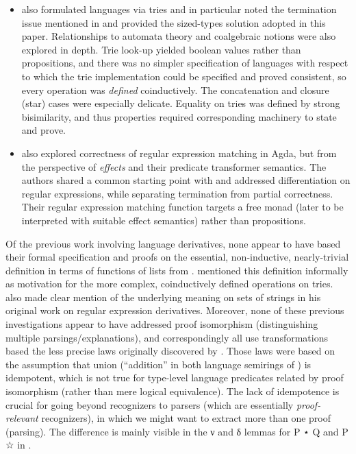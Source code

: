 \documentclass[acmsmall,screen,timestamp,anonymous,review]{acmart}
\begin{document}
\begin{itemize}
\item \citet{Abel2016} also formulated languages via tries and in particular noted the termination issue mentioned in  and provided the sized-types solution adopted in this paper.
Relationships to automata theory and coalgebraic notions were also explored in depth.
Trie look-up yielded boolean values rather than propositions, and there was no simpler specification of languages with respect to which the trie implementation could be specified and proved consistent, so every operation was \emph{defined} coinductively.
The concatenation and closure (star) cases were especially delicate.
Equality on tries was defined by strong bisimilarity, and thus properties required corresponding machinery to state and prove.


\item \citet{BaanenSwierstra2020} also explored correctness of regular expression matching in Agda, but from the perspective of \emph{effects} and their predicate transformer semantics.
The authors shared a common starting point with \citet{KorkutEtAl2016} and addressed differentiation on regular expressions, while separating termination from partial correctness.
Their regular expression matching function targets a free monad (later to be interpreted with suitable effect semantics) rather than propositions.

\end{itemize}

Of the previous work involving language derivatives, none appear to have based their formal specification and proofs on the essential, non-inductive, nearly-trivial definition in terms of functions of lists from .
\citet{Abel2016} mentioned this definition informally as motivation for the more complex, coinductively defined operations on tries.
\citet{Brzozowski64} also made clear mention of the underlying meaning on sets of strings in his original work on regular expression derivatives.
Moreover, none of these previous investigations appear to have addressed proof isomorphism (distinguishing multiple parsings/explanations), and correspondingly all use transformations based the less precise laws originally discovered by \citet{Brzozowski64}.
Those laws were based on the assumption that union (``addition'' in both language semirings of ) is idempotent, which is not true for type-level language predicates related by proof isomorphism (rather than mere logical equivalence).
The lack of idempotence is crucial for going beyond recognizers to parsers (which are essentially \emph{proof-relevant} recognizers), in which we might want to extract more than one proof (parsing).
The difference is mainly visible in the \AF ν and \AF δ lemmas for {\AB P ⋆ \AB Q} and {\AB P ☆} in .


\end{document}
